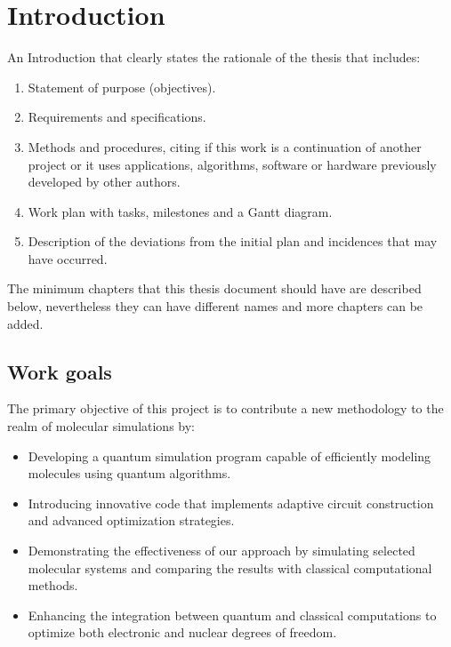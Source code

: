 
\chapter{Introduction}


An Introduction that clearly states the rationale of the thesis that includes:


\begin{enumerate}

  \item Statement of purpose (objectives).

  \item Requirements and specifications.

  \item Methods and procedures, citing if this work is a continuation of another project or it uses applications, algorithms, software or hardware previously developed by other authors.
  
  \item Work plan with tasks, milestones and a Gantt diagram.

  \item Description of the deviations from the initial plan and incidences that may have occurred.
\end{enumerate}
The minimum chapters that this thesis document should have are described below, nevertheless they can have different names and more chapters can be added.

\section{Work goals}
The primary objective of this project is to contribute a new methodology to the realm of molecular simulations by:

\begin{itemize} \item Developing a quantum simulation program capable of efficiently modeling molecules using quantum algorithms. \item Introducing innovative code that implements adaptive circuit construction and advanced optimization strategies. \item Demonstrating the effectiveness of our approach by simulating selected molecular systems and comparing the results with classical computational methods. \item Enhancing the integration between quantum and classical computations to optimize both electronic and nuclear degrees of freedom. \end{itemize}

